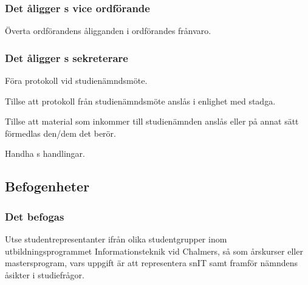 \subsubsection{Det åligger \SNIT{}s vice ordförande}
\begin{att}
	\item Överta ordförandens åligganden i ordförandes frånvaro.
\end{att}

\subsubsection{Det åligger \SNIT{}s sekreterare}
\begin{att}
	\item Föra protokoll vid studienämndsmöte.
	\item Tillse att protokoll från studienämndsmöte anslås i enlighet med stadga.
	\item Tillse att material som inkommer till studienämnden anslås eller på annat sätt förmedlas den/dem det berör.
	\item Handha \SNIT{}s handlingar.
\end{att}

\subsection{Befogenheter}

\subsubsection{Det befogas \SNIT}
\begin{att}
	\item Utse studentrepresentanter ifrån olika studentgrupper inom utbildningsprogrammet Informationsteknik vid Chalmers, så som årskurser eller mastersprogram, vars uppgift är att representera snIT samt framför nämndens åsikter i studiefrågor.
\end{att}
